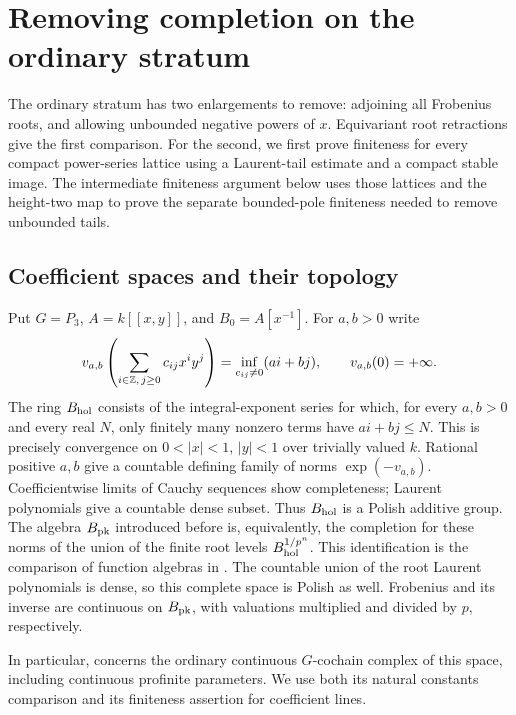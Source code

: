 \section{Removing completion on the ordinary stratum}\label{h3:sec:ordinary}

The ordinary stratum has two enlargements to remove: adjoining all
Frobenius roots, and allowing unbounded negative powers of \(x\).
Equivariant root retractions give the first comparison.  For the second,
we first prove finiteness for every compact power-series lattice using a
Laurent-tail estimate and a compact stable image.  The intermediate
finiteness argument below uses those lattices and the height-two map to prove the separate bounded-pole
finiteness needed to remove unbounded tails.

\subsection{Coefficient spaces and their topology}

Put $G=P_3$, $A=k[[x,y]]$, and $B_0=A[x^{-1}]$.
For $a,b>0$ write
\[
 v_{a,b}\left(\sum_{i\in\mathbb Z,\,j\geq0}c_{ij}x^iy^j\right)
   =\inf_{c_{ij}\ne0}(ai+bj),\qquad v_{a,b}(0)=+\infty.
\]
The ring $B_{\mathrm{hol}}$ consists of the integral-exponent series for which,
for every $a,b>0$ and every real $N$, only finitely many nonzero terms
have $ai+bj\leq N$.  This is precisely convergence on
$0<|x|<1$, $|y|<1$ over trivially valued $k$.
Rational positive $a,b$ give a countable defining family of norms
$\exp(-v_{a,b})$.  Coefficientwise limits of Cauchy sequences show
completeness; Laurent polynomials give a countable dense subset.
Thus $B_{\mathrm{hol}}$ is a Polish additive group.
The algebra $B_{\mathrm{pk}}$ introduced before
 is, equivalently, the completion for
these norms of the union of the finite root levels
$B_{\mathrm{hol}}^{1/p^n}$.  This identification is the comparison of function
algebras in
.
The countable union of the root Laurent polynomials is dense, so this
complete space is Polish as well.  Frobenius and its inverse are
continuous on $B_{\mathrm{pk}}$, with valuations multiplied and divided
by $p$, respectively.

In particular,  concerns the ordinary
continuous $G$-cochain complex of this space, including continuous
profinite parameters.  We use both its natural constants comparison and its
finiteness assertion for coefficient lines.

